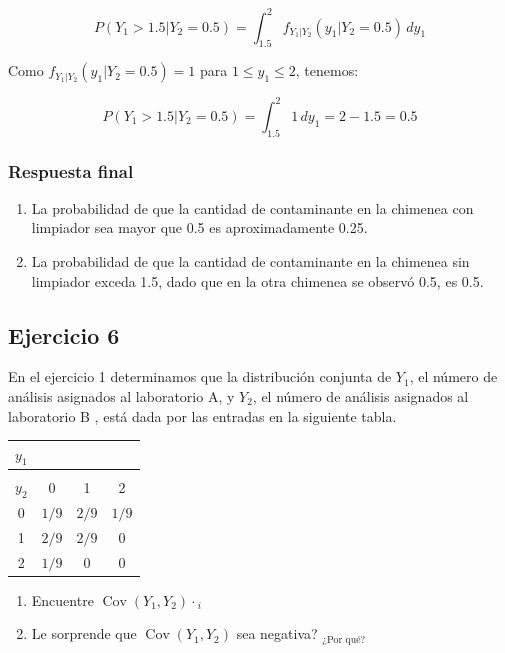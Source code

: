 \documentclass[
]{article}
\providecommand{\tightlist}{%
  \setlength{\itemsep}{0pt}\setlength{\parskip}{0pt}}
\begin{document}
\[
P(Y_1 > 1.5 | Y_2 = 0.5) = \int_{1.5}^{2} f_{Y_1|Y_2}(y_1 | Y_2 = 0.5) \, dy_1
\]

Como \(f_{Y_1|Y_2}(y_1 | Y_2 = 0.5) = 1\) para \(1 \leq y_1 \leq 2\), tenemos:

\[
P(Y_1 > 1.5 | Y_2 = 0.5) = \int_{1.5}^{2} 1 \, dy_1 = 2 - 1.5 = 0.5
\]

\subsubsection{Respuesta final}\label{respuesta-final-1}

\begin{enumerate}
\def\labelenumi{\arabic{enumi}.}
\tightlist
\item
  La probabilidad de que la cantidad de contaminante en la chimenea con limpiador sea mayor que 0.5 es aproximadamente 0.25.
\item
  La probabilidad de que la cantidad de contaminante en la chimenea sin limpiador exceda 1.5, dado que en la otra chimenea se observó 0.5, es 0.5.
\end{enumerate}

\subsection{Ejercicio 6}\label{ejercicio-6}

En el ejercicio 1 determinamos que la distribución conjunta de \(Y_{1}\), el número de análisis asignados al laboratorio A, y \(Y_{2}\), el número de análisis asignados al laboratorio B , está dada por las entradas en la siguiente tabla.

\begin{longtable}[]{@{}cccc@{}}
\toprule\noalign{}
\(y_{1}\) & & & \\
\midrule\noalign{}
\endhead
\bottomrule\noalign{}
\endlastfoot
& & & \\
\(y_{2}\) & 0 & 1 & 2 \\
0 & \(1 / 9\) & \(2 / 9\) & \(1 / 9\) \\
1 & \(2 / 9\) & \(2 / 9\) & 0 \\
2 & \(1 / 9\) & 0 & 0 \\
\end{longtable}

\begin{enumerate}
\def\labelenumi{\alph{enumi}.}
\tightlist
\item
  Encuentre \(\operatorname{Cov}\left(Y_{1}, Y_{2}\right) \cdot{ }_{i}\)
\item
  Le sorprende que \(\operatorname{Cov}\left(Y_{1}, Y_{2}\right)\) sea negativa? \({ }_{\text {¿Por qué? }}\)
\end{enumerate}
\end{document}
